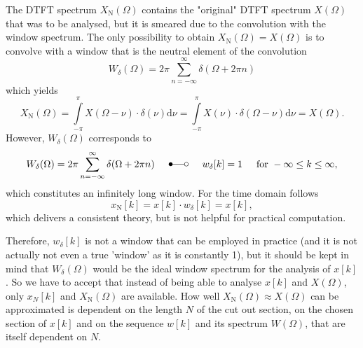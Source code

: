 \documentclass[11pt,a4paper,DIV=12]{scrartcl}
\begin{document}
The DTFT spectrum $X_\text{N}(\Omega)$ contains the "original" DTFT spectrum
$X(\Omega)$ that was to be analysed, but it is smeared due to the convolution
with the window spectrum.
%
The only possibility to obtain $X_\text{N}(\Omega)=X(\Omega)$ is to convolve
with a window that is the neutral element of the convolution
%
\begin{equation}
W_\delta(\Omega)=2\pi\sum_{n=-\infty}^{\infty}\delta(\Omega+2\pi n)
\end{equation}
%
which yields
%
\begin{equation}
X_\text{N}(\Omega)=\int\limits_{-\pi}^{\pi}X(\Omega-\nu)\cdot\delta(\nu)\text{d}\nu
=\int\limits_{-\pi}^{\pi}X(\nu)\cdot\delta(\Omega-\nu)\text{d}\nu=X(\Omega).
\end{equation}
%
However, $W_\delta(\Omega)$ corresponds to \cite[tab.~2.3, p.~90]{Oppenheim2010}
\begin{equation}
W_\delta(\Omega)=2\pi\sum\limits_{n=-\infty}^{\infty}\delta(\Omega+2\pi n) \hspace{5mm}\Laplace\hspace{5mm} w_\delta[k]=1 \hspace{5mm} \text{for}\,\,-\infty\leq k\leq\infty,
\end{equation}
which constitutes an infinitely long window.
%
For the time domain follows
\begin{equation}
x_\text{N}[k]=x[k]\cdot w_\delta[k]=x[k],
\end{equation}
which delivers a consistent theory, but is not helpful for practical computation.

Therefore, $w_\delta[k]$ is not a window that can be employed in practice
(and it is not actually not even a true 'window' as it is constantly 1),
but it should be kept in mind that $W_\delta(\Omega)$ would be the ideal window
spectrum for the analysis of $x[k]$.
%
So we have to accept that instead of being able to analyse $x[k]$ and $X(\Omega)$,
only $x_N[k]$ and $X_\text{N}(\Omega)$ are available.
%
How well $X_\text{N}(\Omega)\approx X(\Omega)$ can be approximated is dependent
on the length $N$ of the cut out section, on the chosen section of $x[k]$ and
on the sequence $w[k]$ and its spectrum $W(\Omega)$, that are itself dependent
on $N$.
\end{document}
